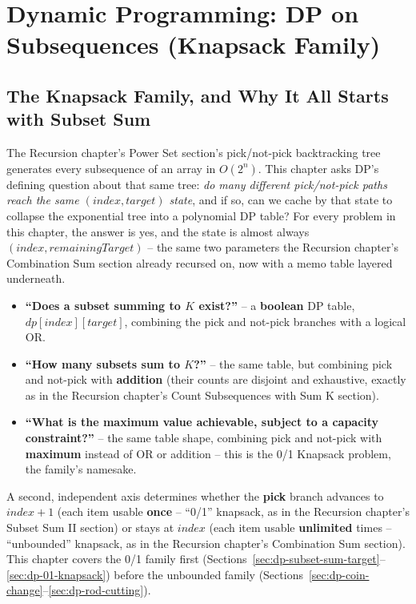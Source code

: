 \chapter{Dynamic Programming: DP on Subsequences (Knapsack Family)}

\section{The Knapsack Family, and Why It All Starts with Subset Sum}
\label{sec:dp-subseq-intro}

The Recursion chapter's Power Set section's pick/not-pick backtracking tree
generates every subsequence of an array in $O(2^n)$. This chapter asks
DP's defining question about that same tree: \emph{do many different
pick/not-pick paths reach the same $(\textit{index}, \textit{target})$
state}, and if so, can we cache by that state to collapse the
exponential tree into a polynomial DP table? For every problem in this
chapter, the answer is yes, and the state is almost always
$(\textit{index}, \textit{remainingTarget})$ -- the same two parameters
the Recursion chapter's Combination Sum section already recursed on, now with a
memo table layered underneath.

\begin{patternbox}
\begin{itemize}
  \item \textbf{``Does a subset summing to $K$ exist?''} -- a
        \textbf{boolean} DP table, $\textit{dp}[\textit{index}][\textit{target}]$,
        combining the pick and not-pick branches with a logical OR.
  \item \textbf{``How many subsets sum to $K$?''} -- the same table,
        but combining pick and not-pick with \textbf{addition} (their
        counts are disjoint and exhaustive, exactly as in
        the Recursion chapter's Count Subsequences with Sum K section).
  \item \textbf{``What is the maximum value achievable, subject to a
        capacity constraint?''} -- the same table shape, combining pick
        and not-pick with \textbf{maximum} instead of OR or addition --
        this is the 0/1 Knapsack problem, the family's namesake.
\end{itemize}
A second, independent axis determines whether the \textbf{pick} branch
advances to $\textit{index}+1$ (each item usable \textbf{once} -- ``0/1''
knapsack, as in the Recursion chapter's Subset Sum II section) or stays at
$\textit{index}$ (each item usable \textbf{unlimited} times --
``unbounded'' knapsack, as in the Recursion chapter's Combination Sum section).
This chapter covers the 0/1 family first (Sections~\ref{sec:dp-subset-sum-target}--\ref{sec:dp-01-knapsack})
before the unbounded family
(Sections~\ref{sec:dp-coin-change}--\ref{sec:dp-rod-cutting}).
\end{patternbox}

